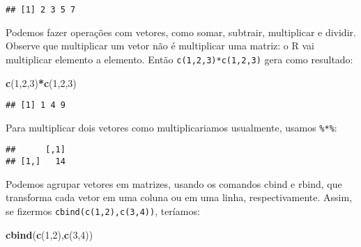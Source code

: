 \documentclass[]{book}
\newenvironment{Shaded}{\begin{snugshade}}{\end{snugshade}}
\newcommand{\KeywordTok}[1]{\textcolor[rgb]{0.13,0.29,0.53}{\textbf{#1}}}
\newcommand{\DecValTok}[1]{\textcolor[rgb]{0.00,0.00,0.81}{#1}}
\newcommand{\OperatorTok}[1]{\textcolor[rgb]{0.81,0.36,0.00}{\textbf{#1}}}
\newcommand{\NormalTok}[1]{#1}
\begin{document}
\begin{verbatim}
## [1] 2 3 5 7
\end{verbatim}

Podemos fazer operações com vetores, como somar, subtrair, multiplicar e
dividir. Observe que multiplicar um vetor não é multiplicar uma matriz:
o R vai multiplicar elemento a elemento. Então
\texttt{c(1,2,3)*c(1,2,3)} gera como resultado:

\begin{Shaded}
\begin{Highlighting}[]
\KeywordTok{c}\NormalTok{(}\DecValTok{1}\NormalTok{,}\DecValTok{2}\NormalTok{,}\DecValTok{3}\NormalTok{)}\OperatorTok{*}\KeywordTok{c}\NormalTok{(}\DecValTok{1}\NormalTok{,}\DecValTok{2}\NormalTok{,}\DecValTok{3}\NormalTok{)}
\end{Highlighting}
\end{Shaded}

\begin{verbatim}
## [1] 1 4 9
\end{verbatim}

Para multiplicar dois vetores como multiplicariamos usualmente, usamos
\texttt{\%*\%}:

\begin{Shaded}
\end{Shaded}

\begin{verbatim}
##      [,1]
## [1,]   14
\end{verbatim}

Podemos agrupar vetores em matrizes, usando os comandos cbind e rbind,
que transforma cada vetor em uma coluna ou em uma linha,
respectivamente. Assim, se fizermos \texttt{cbind(c(1,2),c(3,4))},
teríamos:

\begin{Shaded}
\begin{Highlighting}[]
\KeywordTok{cbind}\NormalTok{(}\KeywordTok{c}\NormalTok{(}\DecValTok{1}\NormalTok{,}\DecValTok{2}\NormalTok{),}\KeywordTok{c}\NormalTok{(}\DecValTok{3}\NormalTok{,}\DecValTok{4}\NormalTok{))}
\end{Highlighting}
\end{Shaded}
\end{document}
